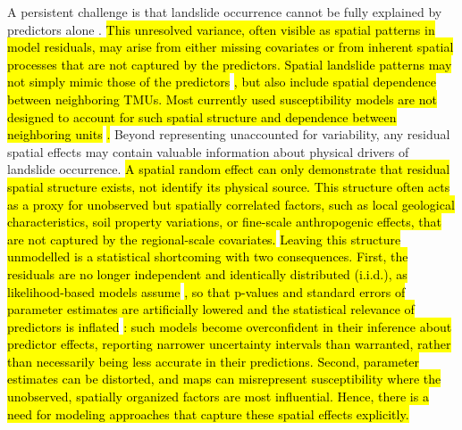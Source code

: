 \documentclass[journal abbreviation, manuscript]{copernicus}
\newcommand{\hlE}[1]{{\sethlcolor{edcyan}\hl{#1}}}
\begin{document}
A persistent challenge is that landslide occurrence cannot be fully explained by predictors alone \citep{di2023estimation}. 
\hl{This unresolved variance, often visible as spatial patterns in model residuals, may arise from either missing covariates or from inherent spatial processes that are not captured by the predictors. 
Spatial landslide patterns may not simply mimic those of the predictors }\citep{lombardo2020space}\hl{, but also include spatial dependence between neighboring TMUs. 
Most currently used susceptibility models are not designed to account for such spatial structure and dependence between neighboring units }\citep{fang2023space}\hl{.} 
Beyond representing unaccounted for variability, any residual spatial effects may contain valuable information about physical drivers of landslide occurrence.
\hl{A spatial random effect can only demonstrate that residual spatial structure exists, not identify its physical source.
This structure often acts as a proxy for unobserved but spatially correlated factors, such as local geological characteristics, soil property variations, or fine-scale anthropogenic effects, that are not captured by the regional-scale covariates.}
\hlE{Leaving this structure unmodelled is a statistical shortcoming with two consequences. First, the residuals are no longer independent and identically distributed (i.i.d.), as likelihood-based models assume }\citep{wagner2013rethinking}\hlE{, so that p-values and standard errors of parameter estimates are artificially lowered and the statistical relevance of predictors is inflated }\citep{lee2021network, lombardo2020space}\hlE{: such models become overconfident in their inference about predictor effects, reporting narrower uncertainty intervals than warranted, rather than necessarily being less accurate in their predictions. Second, parameter estimates can be distorted, and maps can misrepresent susceptibility where the unobserved, spatially organized factors are most influential. Hence, there is a need for modeling approaches that capture these spatial effects explicitly.}
\end{document}
